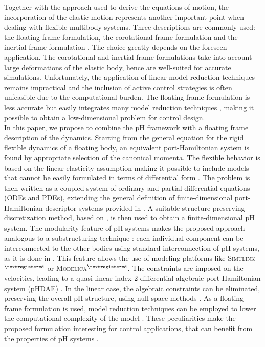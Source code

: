 \documentclass{svjour3}                     %
\begin{document}
\indent Together with the approach used to derive the equations of motion, the incorporation of the elastic motion represents another important point when dealing with flexible multibody systems. Three descriptions are commonly used: the floating frame formulation, the corotational frame formulation and the inertial frame formulation \cite{Ellenbroek2018}. The choice greatly depends on the foreseen application.  The corotational and inertial frame formulations take into account large deformations of the elastic body, hence are well-suited for accurate simulations. Unfortunately, the application of linear model reduction techniques remains impractical \cite{Noor_rev} and the inclusion of active control strategies is often unfeasible due to the computational burden. The floating frame formulation is less accurate but easily integrates many model reduction techniques \cite{NOWAKOWSKI201240}, making it possible to obtain a low-dimensional problem for control design. \\
\indent In this paper, we propose to combine the pH framework with a floating frame description of the dynamics. Starting from the general equation for the rigid flexible dynamics of a floating body, an equivalent port-Hamiltonian system is found by appropriate selection of the canonical momenta. The flexible behavior is based on the linear elasticity assumption making it possible to include models that cannot be easily formulated in terms of differential form  \cite{BRUGNOLI2019940,BRUGNOLI2019961}. The problem is then written as a coupled system of ordinary and partial differential equations (ODEs and PDEs), extending the general definition of finite-dimensional port-Hamiltonian descriptor systems provided in \cite{mehrmann2019structurepreserving}. A suitable structure-preserving discretization method, based on \cite{cardoso2019partitioned}, is then used to obtain a finite-dimensional pH system. The modularity feature of pH systems makes the proposed approach analogous to a substructuring technique \cite{substructuring}: each individual component can be interconnected to the other bodies using standard interconnection of pH systems, as it is done in \cite{macchelli_flrig}. This feature allows the use of modeling platforms like \textsc{Simulink}$^{\tiny{\textregistered}}$ or \textsc{Modelica}$^{\tiny{\textregistered}}$. The constraints are imposed on the velocities, leading to a quasi-linear index 2 differential-algebraic port-Hamiltonian system (pHDAE) \cite{phd_steinbrecher,beattie2018linear}. In the linear case, the algebraic constraints can be eliminated, preserving the overall pH structure, using null space methods \cite{nullspaceFlMult}.  As a floating frame formulation is used, model reduction techniques can be employed to lower the computational complexity of the model \cite{phode_red,phdae_red}. These peculiarities make the proposed formulation interesting for control applications, that can benefit from the properties of pH systems \cite{PHadaptive,ORTEGAsurvey}. \\
\end{document}
